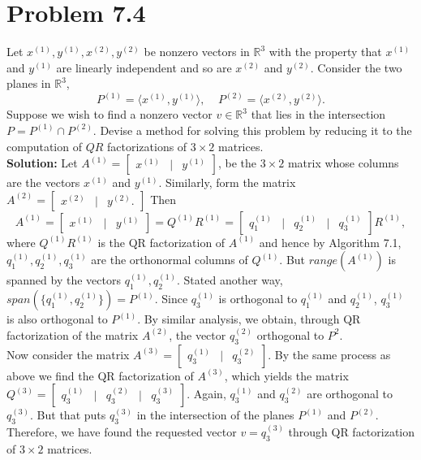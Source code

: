 \documentclass{article}
\begin{document}
\pagebreak
\section*{Problem 7.4}
Let $x^{(1)}, y^{(1)}, x^{(2)}, y^{(2)}$ be nonzero vectors in $\mathbb{R}^3$ with the property that $x^{(1)}$ and $y^{(1)}$ are linearly independent and so are $x^{(2)}$ and $y^{(2)}$. Consider the two planes in $\mathbb{R}^3$, \[ P^{(1)} = \langle x^{(1)}, y^{(1)} \rangle, ~~~~~ P^{(2)} = \langle x^{(2)}, y^{(2)} \rangle. \] Suppose we wish to find a nonzero vector $v \in \mathbb{R}^3$ that lies in the intersection $P =  P^{(1)} \cap P^{(2)}.$  Devise a method for solving this problem by reducing it to the computation of $QR$ factorizations of $3 \times 2$ matrices.\\

\textbf{Solution:} Let $A^{(1)} = \begin{bmatrix}
    x^{(1)} & \lvert &  y^{(1)}
\end{bmatrix}$, be the $3 \times 2$ matrix whose columns are the vectors $x^{(1)}$ and $y^{(1)}$. Similarly, form the matrix $A^{(2)} = \begin{bmatrix}
    x^{(2)} & \lvert &  y^{(2)}.
\end{bmatrix}$
Then \[ A^{(1)} = \begin{bmatrix}
    x^{(1)} & \lvert &  y^{(1)}
\end{bmatrix} = Q^{(1)}R^{(1)} = \begin{bmatrix}
    q_1^{(1)} & \lvert &  q_2^{(1)} & \lvert & q_3^{(1)}
\end{bmatrix}R^{(1)},\]
where $Q^{(1)}R^{(1)}$ is the QR factorization of $A^{(1)}$ and hence by Algorithm 7.1, $q_1^{(1)}, q_2^{(1)}, q_3^{(1)}$ are the orthonormal columns of $Q^{(1)}$. But $range (A^{(1)})$ is spanned by the vectors $q_1^{(1)}, q_2^{(1)}$. Stated another way, $span(\{ q_1^{(1)}, q_2^{(1)} \}) = P^{(1)}$. Since $q_3^{(1)}$ is orthogonal to $q_1^{(1)}$ and  $q_2^{(1)}$, $q_3^{(1)}$ is also orthogonal to $P^{(1)}$. By similar analysis, we obtain, through QR factorization of the matrix $A^{(2)}$, the vector $q_3^{(2)}$ orthogonal to $P^{2}$.\\

Now consider the matrix $A^{(3)} = \begin{bmatrix}
    q_3^{(1)} & \lvert &  q_3^{(2)}
\end{bmatrix}$. By the same process as above we find the QR factorization of $A^{(3)}$, which yields the matrix $Q^{(3)} =  \begin{bmatrix}
    q_3^{(1)} & \lvert &  q_3^{(2)} & \lvert & q_3^{(3)} \end{bmatrix}.$ Again, $q_3^{(1)}$ and $q_3^{(2)}$ are orthogonal to $q_3^{(3)}$. But that puts $q_3^{(3)}$ in the intersection of the planes $P^{(1)}$ and  $P^{(2)}$. Therefore, we have found the requested vector $v = q_3^{(3)}$ through QR factorization of $3 \times 2$ matrices.
\end{document}
